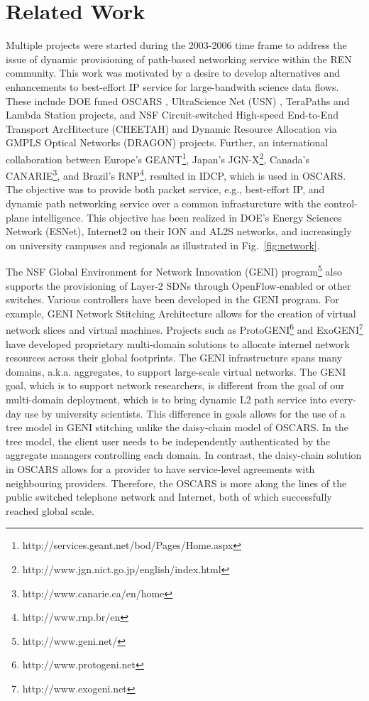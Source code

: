 \section{Related Work}
Multiple projects were started during the 2003-2006 time frame to address the issue of dynamic provisioning of path-based networking service within the REN community. This work was motivated by a desire to develop alternatives and enhancements to best-effort IP service for large-bandwith science data flows. These
include DOE funed OSCARS \cite{OSCARS}, UltraScience Net (USN) \cite{1541694}, TeraPaths \cite{4444698} and Lambda Station \cite{4374315} projects, and NSF Circuit-switched High-speed End-to-End Transport ArcHitecture (CHEETAH) \cite{1497551} and Dynamic Resource Allocation via GMPLS Optical Networks (DRAGON) \cite{4146687} projects. Further, an international
collaboration between Europe's GEANT\footnote{http://services.geant.net/bod/Pages/Home.aspx}, Japan's JGN-X\footnote{http://www.jgn.nict.go.jp/english/index.html}, Canada's CANARIE\footnote{http://www.canarie.ca/en/home},
and Brazil's RNP\footnote{http://www.rnp.br/en}, resulted in IDCP, which
is used in OSCARS. The objective was to provide both packet service, e.g., best-effort IP, and dynamic path networking service over a common infrasturcture with the control-plane intelligence. This objective has been realized in DOE's Energy Sciences Network (ESNet), Internet2 on their ION and AL2S networks, and increasingly on university campuses and regionals as illustrated in Fig.~\ref{fig:network}. 

The NSF Global Environment for Network Innovation (GENI) program\footnote{http://www.geni.net/} also supports the provisioning
of Layer-2 SDNs through OpenFlow-enabled or other switches.
Various controllers have been developed in the GENI program.
For example, GENI Network Stitching Architecture
allows for the creation of virtual network slices and virtual machines. Projects such as ProtoGENI\footnote{http://www.protogeni.net} and ExoGENI\footnote{http://www.exogeni.net} have developed proprietary multi-domain solutions to allocate internel network resources across their global footprints.
The GENI infrastructure spans many domains, a.k.a. aggregates, to support large-scale virtual networks. The GENI goal, which is to support network researchers,
is different from the goal of our multi-domain deployment,
which is to bring dynamic L2 path service into every-day use by university
scientists. This difference in goals allows for the use of a tree model
in GENI stitching unlike the daisy-chain model of OSCARS. In the tree
model, the client user needs to be independently authenticated by the aggregate managers controlling each domain. In contrast, the daisy-chain solution in OSCARS allows for a provider to have service-level agreements with neighbouring providers. Therefore, the OSCARS is more along the lines of the public switched telephone network and Internet, both of which successfully reached global scale.

